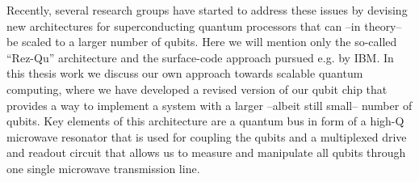 Recently, several research groups have started to address these issues by devising new architectures for superconducting quantum processors that can --in theory-- be scaled to a larger number of qubits. Here we will mention only the so-called ``Rez-Qu'' architecture \citep{galiautdinov_resonatorzero-qubit_2012} and the surface-code approach \citep{divincenzo_fault-tolerant_2009} pursued e.g. by IBM. In this thesis work we discuss our own approach towards scalable quantum computing, where we have developed a revised version of our qubit chip that provides a way to implement a system with a larger --albeit still small-- number of qubits. Key elements of this architecture are a quantum bus in form of a high-Q microwave resonator that is used for coupling the qubits and a multiplexed drive and readout circuit that allows us to measure and manipulate all qubits through one single microwave transmission line. 

